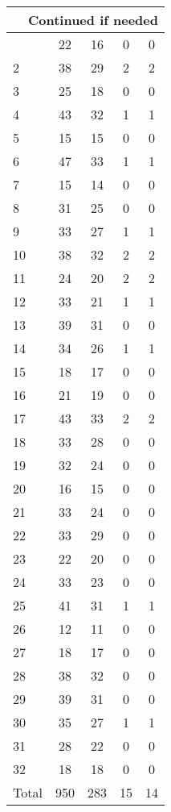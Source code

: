 \begin{center}
\begin{longtable}{l|c|c|c|c}
\hline \multicolumn{5}{|r|}{{Continued if needed}} \\ \hline
\endfoot 
1 & 22 & 16 & 0 & 0\\ \hline
2 & 38 & 29 & 2 & 2\\ \hline
3 & 25 & 18 & 0 & 0\\ \hline
4 & 43 & 32 & 1 & 1\\ \hline
5 & 15 & 15 & 0 & 0\\ \hline
6 & 47 & 33 & 1 & 1\\ \hline
7 & 15 & 14 & 0 & 0\\ \hline
8 & 31 & 25 & 0 & 0\\ \hline
9 & 33 & 27 & 1 & 1\\ \hline
10 & 38 & 32 & 2 & 2\\ \hline
11 & 24 & 20 & 2 & 2\\ \hline
12 & 33 & 21 & 1 & 1\\ \hline
13 & 39 & 31 & 0 & 0\\ \hline
14 & 34 & 26 & 1 & 1\\ \hline
15 & 18 & 17 & 0 & 0\\ \hline
16 & 21 & 19 & 0 & 0\\ \hline
17 & 43 & 33 & 2 & 2\\ \hline
18 & 33 & 28 & 0 & 0\\ \hline
19 & 32 & 24 & 0 & 0\\ \hline
20 & 16 & 15 & 0 & 0\\ \hline
21 & 33 & 24 & 0 & 0\\ \hline
22 & 33 & 29 & 0 & 0\\ \hline
23 & 22 & 20 & 0 & 0\\ \hline
24 & 33 & 23 & 0 & 0\\ \hline
25 & 41 & 31 & 1 & 1\\ \hline
26 & 12 & 11 & 0 & 0\\ \hline
27 & 18 & 17 & 0 & 0\\ \hline
28 & 38 & 32 & 0 & 0\\ \hline
29 & 39 & 31 & 0 & 0\\ \hline
30 & 35 & 27 & 1 & 1\\ \hline
31 & 28 & 22 & 0 & 0\\ \hline
32 & 18 & 18 & 0 & 0\\ \hline
\hline \hline
Total & 950 & 283 & 15 & 14



\end{longtable}
\end{center}

